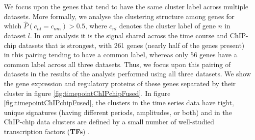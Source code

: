 \documentclass{bmcart}
\begin{document}

We focus upon the genes that tend to have the same cluster label across multiple datasets. More formally, we analyse the clustering structure among genes for which $\hat{P}(c_{nl} = c_{nm}) > 0.5$, where $c_{nl}$ denotes the cluster label of gene $n$ in dataset $l$. In our analysis it is the signal shared across the time course and ChIP-chip datasets that is strongest, with 261 genes (nearly half of the genes present) in this pairing tending to have a common label, whereas only 56 genes have a common label across all three datasets. Thus, we focus upon this pairing of datasets in the results of the analysis performed using all three datasets. We show the gene expression and regulatory proteins of these genes separated by their cluster in figure \ref{fig:timepointChIPchipFused}. In figure \ref{fig:timepointChIPchipFused}, the clusters in the time series data have tight, unique signatures  (having different periods, amplitudes, or both) and in the ChIP-chip data clusters are defined by a small number of well-studied transcription factors (\textbf{TFs}) \citep[see table 2 of the Supplementary Material for details of these TFs, many of which are well known to regulate cell cycle expression,][]{simon2001serial}.

\end{document}
